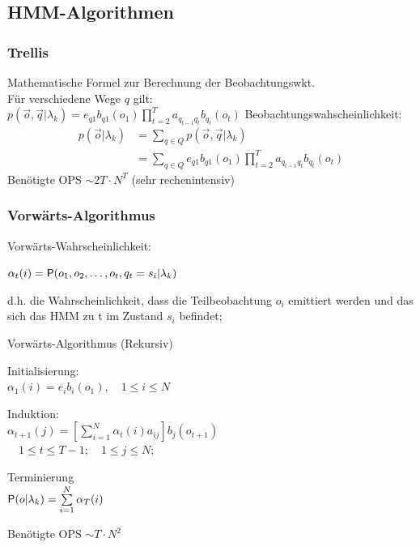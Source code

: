 \documentclass[german,color,6pt]{latex4ei/latex4ei_sheet}
\begin{document}
\begin{sectionbox}
	\subsection{HMM-Algorithmen}

	\subsubsection{Trellis}
	Mathematische Formel zur Berechnung der Beobachtungswkt.\\
	Für verschiedene Wege $q$ gilt: \\
	$p(\vec o, \vec q | \lambda_k) = e_{q1} b_{q1} (o_1) \prod\limits^T _{t=2} a_{q_{t-1} q_t} b_{q_t} (o_t)$
	Beobachtungswahscheinlichkeit:
	\begin{equation*}
	\begin{aligned}
		p(\vec o | \lambda_k) &= \sum\limits_{q \in Q} p(\vec o, \vec q | \lambda_k) \\
		&= \sum\limits_{q \in Q} e_{q1} b_{q1} (o_1) \prod\limits^T _{t=2} a_{q_{t-1} q_t} b_{q_t} (o_t)
	\end{aligned}
	\end{equation*}
	Benötigte OPS $\sim 2T \cdot N^T$ (sehr rechenintensiv)\\

	\subsubsection{Vorwärts-Algorithmus}
	Vorwärts-Wahrscheinlichkeit:

	$\alpha_t (i) = \P(o_1, o_2, \dots , o_t , q_t = s_i | \lambda_k)$

	d.h. die Wahrscheinlichkeit, dass die Teilbeobachtung $o_i$ emittiert werden und das sich das HMM zu t im Zustand $s_i$ befindet;

	\begin{cookbox}{Vorwärts-Algorithmus (Rekursiv)}
		\item Initialisierung: \\
			$\alpha_1(i) = e_i b_i (o_1), \quad 1 \leq i \leq N $\\
		\item Induktion: \\
			$ \alpha_{t+1} (j) = \left[ \sum\limits_{i=1}^N{\alpha_t (i) a_{ij}} \right] b_j (o_{t+1}) $\\
			$  \quad 1 \leq t \leq T-1; \quad 1 \leq j \leq N;$\\
		\item Terminierung \\
			$\P(o|\lambda_k )= \sum\limits_{i=1}^N \alpha _T (i)$\\
	\end{cookbox}
	Benötigte OPS $\sim T \cdot N^2$
\end{sectionbox}
\end{document}
